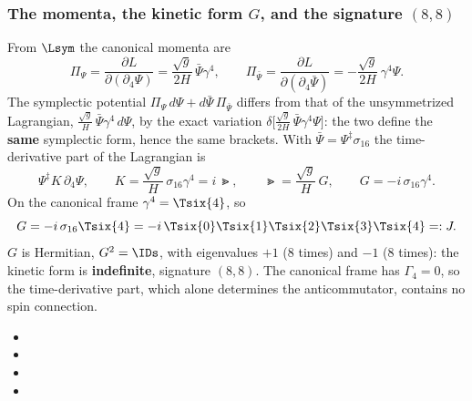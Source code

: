 \subsubsection{The momenta, the kinetic form \texorpdfstring{$G$}{G}, and the signature \texorpdfstring{$(8,8)$}{(8,8)}}
\label{sec:3.5.2}

From $\Lsym$ the canonical momenta are
\[
  \Pi_\Psi=\frac{\partial L}{\partial(\partial_4\Psi)}=\frac{\sqrt g}{2H}\,\bar\Psi\gamma^4,\qquad
  \Pi_{\bar\Psi}=\frac{\partial L}{\partial(\partial_4\bar\Psi)}=-\frac{\sqrt g}{2H}\,\gamma^4\Psi .
\]
The symplectic potential $\Pi_\Psi\,d\Psi+d\bar\Psi\,\Pi_{\bar\Psi}$ differs from that of the
unsymmetrized Lagrangian, $\frac{\sqrt g}{H}\,\bar\Psi\gamma^4\,d\Psi$, by the exact variation
$\delta\bigl[\frac{\sqrt g}{2H}\,\bar\Psi\gamma^4\Psi\bigr]$: the two define the \textbf{same}
symplectic form, hence the same brackets. With $\bar\Psi=\Psi^{\ddagger}\sigma_{16}$ the
time-derivative part of the Lagrangian is
\[
  \Psi^{\ddagger}K\,\partial_4\Psi,\qquad K=\frac{\sqrt g}{H}\,\sigma_{16}\gamma^4=i\,\Gt,\qquad
  \Gt=\frac{\sqrt g}{H}\,G,\qquad G=-i\,\sigma_{16}\gamma^4 .
\]
On the canonical frame $\gamma^4=\Tsix{4}$, so
\[
  G=-i\,\sigma_{16}\Tsix{4}=-i\,\Tsix{0}\Tsix{1}\Tsix{2}\Tsix{3}\Tsix{4}=:J .
\]
$G$ is Hermitian, $G^2=\IDs$, with eigenvalues $+1$ (8 times) and $-1$ (8 times): the kinetic form is
\textbf{indefinite}, signature $(8,8)$. The canonical frame has $\Gamma_4=0$, so the time-derivative
part, which alone determines the anticommutator, contains no spin connection. 
\begin{itemize}
  \item {}
  \item {}
  \item {}
  \item {}
\end{itemize}

